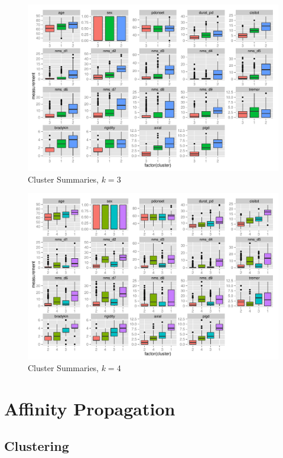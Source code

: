 \documentclass[letterpaper,12pt]{article}
\begin{document}
\begin{figure}[h]
  \centering
  \includegraphics[width=\linewidth]{kmeans-summaries-3.pdf}
  \caption{Cluster Summaries, $k = 3$}
  \label{fig:kmeans-summaries-3}
\end{figure}

\begin{figure}[h]
  \centering
  \includegraphics[width=\linewidth]{kmeans-summaries-4.pdf}
  \caption{Cluster Summaries, $k = 4$}
  \label{fig:kmeans-summaries-4}
\end{figure}

\clearpage
\section{Affinity Propagation}

\subsection{Clustering}
\end{document}
